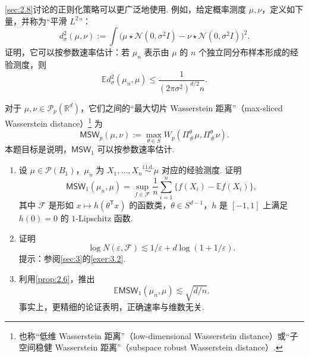\begin{exercise}\label{exer:2.8}
\autoref{sec:2.8}讨论的正则化策略可以更广泛地使用. 例如，给定概率测度 $\mu,\nu$，定义如下量，并称为“平滑 $L^2$”：
$$d_\sigma^2(\mu,\nu):=\int\bigl(\mu\star\mathcal N(0,\sigma^2I)-\nu\star\mathcal N(0,\sigma^2I)\bigr)^2.$$
证明，它可以按参数速率估计：若 $\mu_n$ 表示由 $\mu$ 的 $n$ 个独立同分布样本形成的经验测度，则
$$\mathbb E d_\sigma^2(\mu_n,\mu)\le\frac1{(2\pi\sigma^2)^{d/2}n}.$$
\end{exercise}

\begin{exercise}\label{exer:2.9}
对于 $\mu,\nu\in\mathcal P_p(\mathbb R^d)$，它们之间的“最大切片 Wasserstein 距离”（max-sliced Wasserstein distance）\cite{ref109,ref182}\footnote{也称“低维 Wasserstein 距离”（low-dimensional Wasserstein distance）\cite{ref241}或“子空间稳健 Wasserstein 距离”（subspace robust Wasserstein distance）\cite{ref256}.} 为
$$\mathsf{MSW}_p(\mu,\nu):=\max_{\theta\in S}W_p(\Pi^\theta_\#\mu,\Pi^\theta_\#\nu).$$
本题目标是说明，$\mathsf{MSW}_1$ 可以按参数速率估计.
\begin{enumerate}
\item[(a)] 设 $\mu\in\mathcal P(B_1)$，$\mu_n$ 为 $X_1,\ldots,X_n\overset{\mathrm{i.i.d.}}\sim\mu$ 对应的经验测度. 证明
$$\mathsf{MSW}_1(\mu_n,\mu)=\sup_{f\in\mathcal F}\frac1n\sum_{i=1}^n\{f(X_i)-\mathbb Ef(X_i)\},$$
其中 $\mathcal F$ 是形如 $x\mapsto h(\theta^{\mathsf T}x)$ 的函数类，$\theta\in S^{d-1}$，$h$ 是 $[-1,1]$ 上满足 $h(0)=0$ 的 $1$-Lipschitz 函数.
\item[(b)] 证明
$$\log N(\varepsilon,\mathcal F)\lesssim1/\varepsilon+d\log(1+1/\varepsilon).$$
提示：参阅\autoref{sec:3}的\autoref{exer:3.2}.
\item[(c)] 利用\autoref{prop:2.6}，推出
$$\mathbb E\mathsf{MSW}_1(\mu_n,\mu)\lesssim\sqrt{d/n}.$$
事实上，更精细的论证表明，正确速率与维数无关\cite{ref44}.
\end{enumerate}
\end{exercise}
